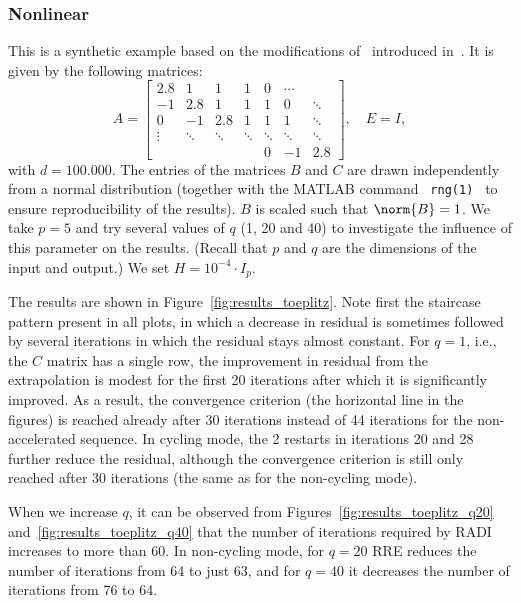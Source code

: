 \subsubsection{Nonlinear}
This is a synthetic example based on the modifications of~\cite[Example~1]{lin2015new} introduced in~\cite[Example~4.4]{benner2020numerical}.
It is given by the following matrices:
\begin{equation}
A=\left[\begin{array}{ccccccc}
2.8 & 1 & 1 & 1 & 0 & \cdots & \\
-1 & 2.8 & 1 & 1 & 1 & 0 & \ddots \\
0 & -1 & 2.8 & 1 & 1 & 1 & \ddots \\
\vdots & \ddots & \ddots & \ddots & \ddots & \ddots & \ddots \\
& & & & 0 & -1 & 2.8
\end{array}\right], \quad E=I,
\end{equation}
with $d = \num{100,000}$.
The entries of the matrices $B$ and $C$ are drawn independently from a normal distribution
(together with the MATLAB command \lstinline{ rng(1) } to ensure reproducibility of the results).  %
$B$ is scaled such that $\norm{B} = 1$.
We take $p = 5$ and try several values of $q$ (1, 20 and 40) to investigate the influence of this parameter on the results.
(Recall that $p$ and $q$ are the dimensions of the input and output.)
We set $H = 10^{-4} \cdot I_p$.

The results are shown in Figure~\ref{fig:results_toeplitz}.
Note first the staircase pattern present in all plots, in which a decrease in residual is sometimes followed by several iterations in which the residual stays almost constant.
For $q = 1$, i.e., the $C$ matrix has a single row, the improvement in residual from the extrapolation is modest for the first 20 iterations after which it is significantly improved.
As a result, the convergence criterion (the horizontal line in the figures) is reached already after 30 iterations instead of 44 iterations for the non-accelerated sequence.
In cycling mode, the 2 restarts in iterations 20 and 28 further reduce the residual, although the convergence criterion is still only reached after 30 iterations (the same as for the non-cycling mode).

When we increase $q$, it can be observed from Figures~\ref{fig:results_toeplitz_q20} and~\ref{fig:results_toeplitz_q40} that the number of iterations required by RADI increases to more than 60.
In non-cycling mode, for $q = 20$ \ac{RRE} reduces the number of iterations from 64 to just 63,
and for $q = 40$ it decreases the number of iterations from 76 to 64.

